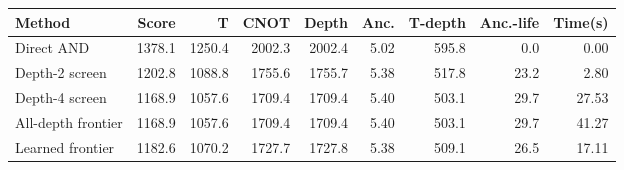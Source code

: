 \begin{tabular*}{\linewidth}{@{\extracolsep{\fill}}lrrrrrrrr}
\toprule
Method & Score & T & CNOT & Depth & Anc. & T-depth & Anc.-life & Time(s) \\
\midrule
Direct AND & 1378.1 & 1250.4 & 2002.3 & 2002.4 & 5.02 & 595.8 & 0.0 & 0.00 \\
Depth-2 screen & 1202.8 & 1088.8 & 1755.6 & 1755.7 & 5.38 & 517.8 & 23.2 & 2.80 \\
Depth-4 screen & 1168.9 & 1057.6 & 1709.4 & 1709.4 & 5.40 & 503.1 & 29.7 & 27.53 \\
All-depth frontier & 1168.9 & 1057.6 & 1709.4 & 1709.4 & 5.40 & 503.1 & 29.7 & 41.27 \\
Learned frontier & 1182.6 & 1070.2 & 1727.7 & 1727.8 & 5.38 & 509.1 & 26.5 & 17.11 \\
\bottomrule
\end{tabular*}
